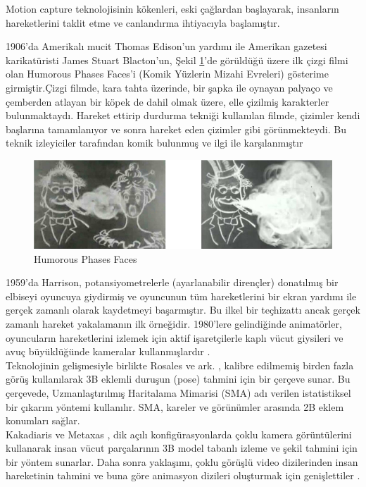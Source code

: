 \documentclass[12pt, a4paper]{article}
\begin{document}
Motion capture teknolojisinin kökenleri, eski çağlardan başlayarak, insanların hareketlerini taklit etme ve canlandırma ihtiyacıyla başlamıştır.

1906’da Amerikalı mucit Thomas Edison’un yardımı ile Amerikan gazetesi karikatüristi
James Stuart Blacton’un, Şekil \ref{fig:boat1}'de görüldüğü üzere ilk çizgi filmi olan Humorous Phases Faces’i (Komik Yüzlerin Mizahi
Evreleri) gösterime girmiştir.Çizgi filmde, kara tahta üzerinde, bir şapka ile oynayan palyaço ve çemberden atlayan bir köpek de dahil olmak üzere, elle çizilmiş karakterler bulunmaktaydı. Hareket ettirip durdurma tekniği kullanılan filmde, çizimler kendi başlarına tamamlanıyor ve sonra hareket eden çizimler gibi görünmekteydi. Bu teknik izleyiciler tarafından komik bulunmuş ve ilgi ile karşılanmıştır \cite{erdem2021sanali}

\begin{figure}[!h]
	\centering
	\includegraphics[width=10 cm , height = 3 cm ]{film.png}
	\caption{Humorous Phases Faces}
	\label{fig:boat1}
\end{figure}


1959’da Harrison, potansiyometrelerle (ayarlanabilir
dirençler) donatılmış bir elbiseyi oyuncuya giydirmiş ve oyuncunun tüm hareketlerini bir ekran
yardımı ile gerçek zamanlı olarak kaydetmeyi başarmıştır. Bu ilkel bir teçhizattı ancak gerçek
zamanlı hareket yakalamanın ilk örneğidir. 1980’lere gelindiğinde animatörler,
oyuncuların hareketlerini izlemek için aktif işaretçilerle kaplı vücut giysileri ve avuç
büyüklüğünde kameralar kullanmışlardır \cite{erdem2021sanali}. \\

 Teknolojinin gelişmesiyle birlikte Rosales ve ark. \cite{rosalesestimating}, kalibre edilmemiş birden fazla görüş kullanılarak 3B eklemli duruşun (pose) tahmini için bir çerçeve sunar. Bu çerçevede, Uzmanlaştırılmış Haritalama Mimarisi (SMA) adı verilen istatistiksel bir çıkarım yöntemi kullanılır. SMA, kareler ve görünümler arasında 2B eklem konumları sağlar.\\

Kakadiaris ve Metaxas \cite{desmarais2021review} , dik açılı konfigürasyonlarda çoklu kamera görüntülerini kullanarak insan vücut parçalarının 3B model tabanlı izleme ve şekil tahmini için bir yöntem sunarlar. Daha sonra yaklaşımı, çoklu görüşlü video dizilerinden insan hareketinin tahmini ve buna göre animasyon dizileri oluşturmak için genişlettiler . 
\end{document}
